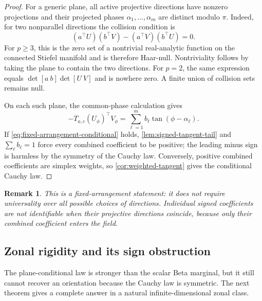 \documentclass[11pt]{article}
\numberwithin{equation}{section}
\theoremstyle{thmstyleone}%
\theoremstyle{thmstyletwo}%
\newtheorem*{remark}{Remark}%
\let\cref\autoref
\begin{document}
\begin{proof}
For a generic plane, all active projective directions have nonzero
projections and their projected phases
\(\alpha_1,\ldots,\alpha_m\) are distinct modulo \(\pi\).  Indeed, for two
nonparallel directions the collision condition is
\[
  (a^\top U)(b^\top V)-(a^\top V)(b^\top U)=0.
\]
For \(p\geq3\), this is the zero set of a nontrivial real-analytic function
on the connected Stiefel manifold and is therefore Haar-null.  Nontriviality
follows by taking the plane to contain the two directions.  For \(p=2\), the
same expression equals
\(\det[a\ b]\det[U\ V]\) and is nowhere zero.  A finite union of collision
sets remains null.

On each such plane, the common-phase calculation gives
\[
  -T_{a,c}(U_\phi)^\top V_\phi
  =
  \sum_{\ell=1}^m b_\ell\tan(\phi-\alpha_\ell).
\]
If \cref{eq:fixed-arrangement-conditional} holds,
\cref{lem:signed-tangent-tail} and \(\sum_\ell b_\ell=1\) force every
combined coefficient to be positive; the leading minus sign is harmless by
the symmetry of the Cauchy law.  Conversely, positive combined
coefficients are simplex weights, so \cref{cor:weighted-tangent} gives the
conditional Cauchy law.
\end{proof}

\begin{remark}
This is a fixed-arrangement statement: it does not require universality
over all possible choices of directions.  Individual signed coefficients
are not identifiable when their projective directions coincide, because
only their combined coefficient enters the field.
\end{remark}

\subsection{Zonal rigidity and its sign obstruction}

The plane-conditional law is stronger than the scalar Beta marginal, but it
still cannot recover an orientation because the Cauchy law is symmetric.
The next theorem gives a complete answer in a natural infinite-dimensional
zonal class.
\end{document}
